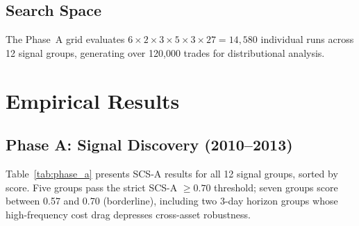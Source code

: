 \documentclass[12pt,a4paper]{article}
\begin{document}
\subsection{Search Space}

The Phase~A grid evaluates $6 \times 2 \times 3 \times 5 \times 3 \times 27 = 14{,}580$ individual runs across 12 signal groups, generating over 120,000 trades for distributional analysis.


\section{Empirical Results}
\label{sec:results}

\subsection{Phase A: Signal Discovery (2010--2013)}

Table~\ref{tab:phase_a} presents SCS-A results for all 12 signal groups, sorted by score. Five groups pass the strict SCS-A $\geq 0.70$ threshold; seven groups score between 0.57 and 0.70 (borderline), including two 3-day horizon groups whose high-frequency cost drag depresses cross-asset robustness.
\end{document}
